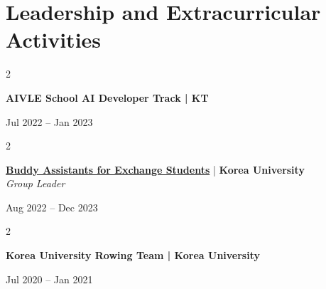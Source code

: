 \documentclass[11pt, letterpaper]{article}
\newenvironment{highlights}{
    \begin{itemize}[
        topsep=0.10 cm,
        parsep=0.10 cm,
        partopsep=0pt,
        itemsep=0pt,
        leftmargin=0 cm + 10pt
    ]
}{
    \end{itemize}
} %
\newenvironment{twocolentry}[2][]{
    \onecolentry
    \def\secondColumn{#2}
    \setcolumnwidth{\fill, 4.8 cm}
    \begin{paracol}{2}
}{
    \switchcolumn \raggedleft \secondColumn
    \end{paracol}
    \endonecolentry
} %
\begin{document}
\section{Leadership and Extracurricular Activities}
        \begin{twocolentry}{
             Jul 2022 -- Jan 2023\\ 
        }
        \textbf{AIVLE School AI Developer Track | KT}
        \end{twocolentry}
         \vspace{0.15 cm}  

        \begin{twocolentry}{
             Aug 2022 -- Dec 2023\\ 
        }
        \href{https://gsc.korea.ac.kr/gsc/Life/StudentActivities/Buddy/Buddy.do}{\textbf{Buddy Assistants for Exchange Students}} | \textbf{Korea University}\\
        \textit{Group Leader}
        \end{twocolentry}

         \vspace{0.15 cm}  

        \begin{twocolentry}{
             Jul 2020 -- Jan 2021\\ 
        }
        \textbf{Korea University Rowing Team | Korea University}
        \end{twocolentry}
         \vspace{0.15 cm}  
\end{document}
